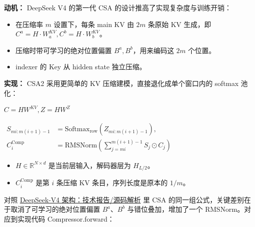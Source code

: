 \documentclass[zihao=false,fontset=windows]{ctexart}
\newcommand{\incode}[1]{\colorbox{inlinebg}{\ttfamily\small #1}}
\newcommand{\bigmath}[1]{%
  \begin{center}\large$\displaystyle #1$\end{center}%
}
\begin{document}
\textcolor{feishuRed}{\textbf{动机：}} DeepSeek V4 的第一代 CSA 的设计推高了实现复杂度与训练开销：\par
\begin{itemize}
\item 
在压缩率 $m$ 设置下，每条 main KV 由 $2m$ 条原始 KV 生成，即 $C^a=H\cdot W_a^{KV}, C^b=H\cdot W_b^{KV}$。\par
\item 
压缩时带可学习的绝对位置偏置 $B^a,B^b$，用来编码这 $2m$ 个位置。\par
\item 
indexer 的 Key 从 hidden state 独立压缩。\par
\end{itemize}

\textcolor{feishuRed}{\textbf{实现：}} CSA2 采用更简单的 KV 压缩建模，直接退化成单个窗口内的 softmax 池化：\par

\bigmath{C=HW^{KV},Z=HW^Z}

\bigmath{\begin{aligned}S_{mi:m(i+1)-1}&=\mathrm{Softmax}_{\mathrm{row}}\!\left(Z_{mi:m(i+1)-1}\right),\\ C_i^{\mathrm{Comp}}&=\mathrm{RMSNorm}\!\left(\sum_{j=mi}^{m(i+1)-1}S_j\odot C_j\right)\end{aligned}}
\begin{itemize}
\item 
$H\in\mathbb{R}^{N\times d}$ 是当前层输入，解码器层为 $H_{L/2}$。\par
\item 
$C_i^{\mathrm{Comp}}$ 是第 $i$ 条压缩 KV 条目，序列长度是原本的 $1/m$。\par
\end{itemize}

对照 \href{https://my.feishu.cn/wiki/UsuawakRYiqacxkD9vxcKzylnoe}{DeepSeek-V4 架构：技术报告/源码解析}\textbf{ }里 CSA 的同一组公式，关键差别在于取消了可学习的绝对位置偏置 $B^a$、$B^b$ 与错位叠加，增加了一个 RMSNorm。对应到实现代码 \incode{Compressor.forward}：\par
\end{document}

